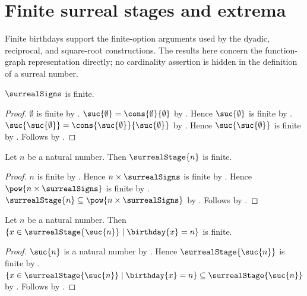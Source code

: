 


\section{Finite surreal stages and extrema}

Finite birthdays support the finite-option arguments used by the dyadic,
reciprocal, and square-root constructions.  The results here concern the
function-graph representation directly; no cardinality assertion is hidden
in the definition of a surreal number.

\begin{proposition}\label{surreal_signs_finite}
    $\surrealSigns$ is finite.
\end{proposition}
\begin{proof}
    $\emptyset$ is finite by .
    $\suc{\emptyset}=\cons{\emptyset}{\emptyset}$
        by .
    Hence $\suc{\emptyset}$ is finite by .
    $\suc{\suc{\emptyset}}
        =\cons{\suc{\emptyset}}{\suc{\emptyset}}$
        by .
    Hence $\suc{\suc{\emptyset}}$ is finite by .
    Follows by .
\end{proof}

\begin{theorem}\label{finite_surreal_stage}
    Let $n$ be a natural number.
    Then $\surrealStage{n}$ is finite.
\end{theorem}
\begin{proof}
    $n$ is finite by .
    Hence $n\times\surrealSigns$ is finite
        by .
    Hence $\pow{n\times\surrealSigns}$ is finite
        by .
    $\surrealStage{n}\subseteq\pow{n\times\surrealSigns}$
        by .
    Follows by .
\end{proof}

\begin{corollary}\label{finite_surreal_birthday_level}
    Let $n$ be a natural number.
    Then
        $\{x\in\surrealStage{\suc{n}}\mid\birthday{x}=n\}$
        is finite.
\end{corollary}
\begin{proof}
    $\suc{n}$ is a natural number by .
    Hence $\surrealStage{\suc{n}}$ is finite
        by .
    $\{x\in\surrealStage{\suc{n}}\mid\birthday{x}=n\}
        \subseteq\surrealStage{\suc{n}}$
        by .
    Follows by .
\end{proof}

